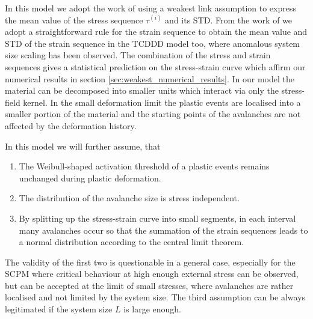 In this model we adopt the work of \citet{doi:10.1080/14786435.2014.932502} using a weakest link assumption to express the mean value of the stress sequence ${\tau ^{\left( i \right)}}$ and its STD. From the work of \citet{PhysRevLett.112.235501} we adopt a straightforward rule for the strain sequence to obtain the mean value and STD of the strain sequence in the TCDDD model too, where anomalous system size scaling has been observed. The combination of the stress and strain sequences gives a statistical prediction on the stress-strain curve which affirm our numerical results in section \ref{sec:weakest_numerical_results}. In our model the material can be decomposed into smaller units which interact via only the stress-field kernel. In the small deformation limit the plastic events are localised into a smaller portion of the material and the starting points of the avalanches are not affected by the deformation history.

In this model we will further assume, that
\begin{enumerate}
\item The Weibull-shaped activation threshold of a plastic events remains unchanged during plastic deformation.
\item The distribution of the avalanche size is stress independent.
\item By splitting up the stress-strain curve into small segments, in each interval many avalanches occur so that the summation of the strain sequences leads to a normal distribution according to the central limit theorem.
\end{enumerate}
The validity of the first two is questionable in a general case, especially for the SCPM where critical behaviour at high enough external stress can be observed, but can be accepted at the limit of small stresses, where avalanches are rather localised and not limited by the system size. The third assumption can be always legitimated if the system size $L$ is large enough.


